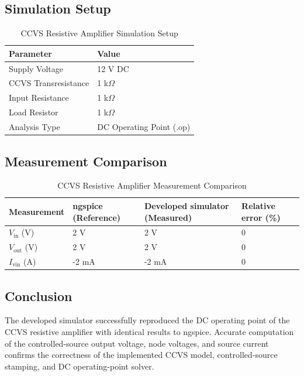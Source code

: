 \subsection{Simulation Setup}
\begin{table}[H]
\centering
\caption{CCVS Resistive Amplifier Simulation Setup}
\label{tab:ccvs_setup}
\begin{tabular}{ll}
\toprule
\textbf{Parameter} & \textbf{Value} \\
\midrule
Supply Voltage        & 12 V DC \\
CCVS Transresistance & 1 k$\Omega$ \\
Input Resistance      & 1 k$\Omega$ \\
Load Resistor         & 1 k$\Omega$ \\
Analysis Type         & DC Operating Point (.op) \\
\bottomrule
\end{tabular}
\end{table}

\subsection{Measurement Comparison}
\begin{table}[H]
\centering
\caption{CCVS Resistive Amplifier Measurement Comparison}
\label{tab:ccvs_comparison}
\begin{tabular}{llll}
\toprule
\textbf{Measurement} & \textbf{ngspice (Reference)} & \textbf{Developed simulator (Measured)} & \textbf{Relative error (\%)} \\
\midrule
$V_{\text{in}}$ (V)  & 2 V   & 2 V     & 0 \\
$V_{\text{out}}$ (V) & 2 V   & 2 V     & 0 \\
$I_{\text{vin}}$ (A) & -2 mA & -2 mA   & 0 \\
\bottomrule
\end{tabular}
\end{table}

\subsection{Conclusion}
The developed simulator successfully reproduced the DC operating point of the CCVS resistive amplifier with identical results to ngspice. Accurate computation of the controlled-source output voltage, node voltages, and source current confirms the correctness of the implemented CCVS model, controlled-source stamping, and DC operating-point solver.

